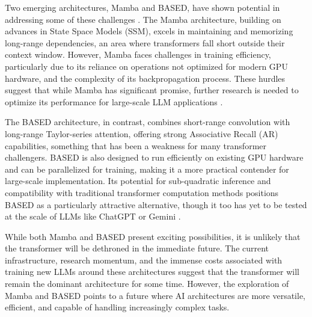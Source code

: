 Two emerging architectures, Mamba and BASED, have shown potential in addressing some of these challenges \cite{gu2023mamba, arora2023based}. The Mamba architecture, building on advances in State Space Models (SSM), excels in maintaining and memorizing long-range dependencies, an area where transformers fall short outside their context window. However, Mamba faces challenges in training efficiency, particularly due to its reliance on operations not optimized for modern GPU hardware, and the complexity of its backpropagation process. These hurdles suggest that while Mamba has significant promise, further research is needed to optimize its performance for large-scale LLM applications \cite{gu2023mamba}.

The BASED architecture, in contrast, combines short-range convolution with long-range Taylor-series attention, offering strong Associative Recall (AR) capabilities, something that has been a weakness for many transformer challengers. BASED is also designed to run efficiently on existing GPU hardware and can be parallelized for training, making it a more practical contender for large-scale implementation. Its potential for sub-quadratic inference and compatibility with traditional transformer computation methods positions BASED as a particularly attractive alternative, though it too has yet to be tested at the scale of LLMs like ChatGPT or Gemini \cite{arora2023based}.

While both Mamba and BASED present exciting possibilities, it is unlikely that the transformer will be dethroned in the immediate future. The current infrastructure, research momentum, and the immense costs associated with training new LLMs around these architectures suggest that the transformer will remain the dominant architecture for some time. However, the exploration of Mamba and BASED points to a future where AI architectures are more versatile, efficient, and capable of handling increasingly complex tasks.
